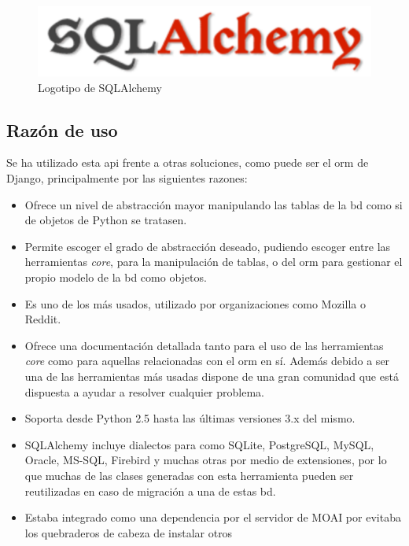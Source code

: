 \begin{figure}[!htbp]
	\centering
	\includegraphics[scale=0.5]{fig/sqla_logo}
	\caption{Logotipo de SQLAlchemy}
\end{figure}

\subsection{Razón de uso}

Se ha utilizado esta \acrshort{api} frente a otras soluciones, como puede ser el \acrshort{orm} de Django, principalmente por las siguientes razones:

\begin{itemize}
	\item Ofrece un nivel de abstracción mayor manipulando las tablas de la \acrshort{bd} como si de objetos de Python se tratasen.
	\item Permite escoger el grado de abstracción deseado, pudiendo escoger entre las herramientas \textit{core}, para la manipulación de tablas, o del \acrshort{orm} para gestionar el propio modelo de la \acrshort{bd} como objetos.
	\item Es uno de los  más usados, utilizado por organizaciones como Mozilla\cite{Mozilla} o Reddit\cite{Reddit}.
	\item Ofrece una documentación detallada tanto para el uso de las herramientas \textit{core} como para aquellas relacionadas con el \acrshort{orm} en sí. Además debido a ser una de las herramientas más usadas dispone de una gran comunidad que está dispuesta a ayudar a resolver cualquier problema.
	\item Soporta desde Python 2.5 hasta las últimas versiones 3.x del mismo.
	\item SQLAlchemy incluye dialectos para  como SQLite, PostgreSQL, MySQL, Oracle\cite{Oracle}, MS-SQL\cite{MSSQL}, Firebird\cite{Firebird} y muchas otras por medio de extensiones, por lo que muchas de las clases generadas con esta herramienta pueden ser reutilizadas en caso de migración a una de estas \acrshort{bd}.
	\item Estaba integrado como una dependencia por el servidor de MOAI por evitaba los quebraderos de cabeza de instalar otros 
\end{itemize}

